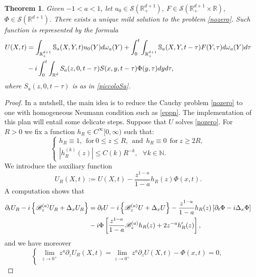 \documentclass[11pt,letter]{amsart}
\def \RN {\mathbb{R}_+^{d+1}}
\def \R {\mathbb{R}}
\newcommand{\Rd}{\mathbb R^d}
\newcommand{\p}{\partial}
\numberwithin{equation}{section}
\newtheorem{theorem}{Theorem}[section]
\numberwithin{equation}{section}
\begin{document}
\begin{theorem}\label{T:U}
Given $-1<a<1$, let $u_0\in \mathscr S(\RN)$, $F \in \mathscr S(\RN\times \R)$, $\Phi\in \mathscr S(\R^{d+1})$. There exists a unique mild solution to the problem \eqref{nozero}. Such function is represented by the formula
\begin{align}\label{nicea1}
U(X,t) & = \int_{\RN} \mathbb S_a(X,Y,t) u_0(Y)d\omega_a(Y) +  \int_0^t \int_{\RN} \mathbb S_a(X,Y,t-\tau) F(Y,\tau) d\omega_a(Y) d\tau
\\
& - i \int_0^{t} \int_{\Rd}  S_a(z,0,t-\tau)S(x,y,t-\tau) \Phi(y,\tau) dy d\tau,
\notag
\end{align}
where $S_a(z,0,t-\tau)$ is as in \eqref{piccoloSa}.
\end{theorem}


\begin{proof}
In a nutshell, the main idea is to reduce the Cauchy problem \eqref{nozero} to one with homogeneous Neumann condition such as \eqref{eppn}. The implementation of this plan will entail some delicate steps. 
Suppose that $U$ solves \eqref{nozero}. For $R>0$ we fix  a function $h_R\in C^\infty[0,\infty)$ such that:
\begin{equation}\label{hR}
\begin{cases}
 h_R\equiv 1,\ \  \text{for}\ 0\le z\le R,\ \ \text{and}\ \ h_R\equiv 0\ \  \text{for}\ z\ge 2 R,
 \\
|h_R^{(k)}(z)|\le C(k) R^{-k}, \ \ \ \forall k\in \mathbb N.
\end{cases}
\end{equation}
We introduce the auxiliary function
\begin{equation}\label{UV}
U_R(X,t) := U(X,t) - \frac{z^{1-a}}{1-a} h_R(z) \Phi(x,t).
\end{equation}
A computation shows that 
\begin{align}\label{ele}
 \p_t U_R - i \left\{\mathscr B_z^{(a)} U_R +  \Delta_x U_R\right\} & = \p_t U - i \left\{\mathscr B_z^{(a)} U +  \Delta_x U\right\} - \frac{z^{1-a}}{1-a} h_R(z) \left[\p_t \Phi - i  \Delta_x \Phi\right]
\notag
\\
& - i \Phi\left[\frac{z^{1-a}}{1-a}\mathscr B_z^{(a)}h_R(z) + 2 z^{-a} h_R'(z)\right],
\notag
\end{align} 
and we have moreover
\begin{equation}\label{par}
\begin{cases}
\underset{z\to 0^+}{\lim} z^a \p_z U_R(X,t) = \underset{z\to 0^+}{\lim} z^a \p_z U(X,t) - \Phi(x,t) = 0,
\\

\end{cases}
\end{equation}
\end{proof}
\end{document}

